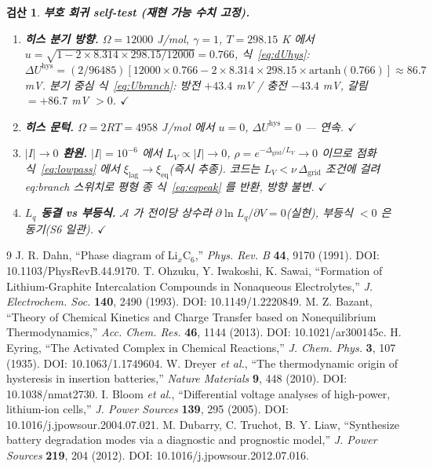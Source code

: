 \documentclass[11pt,a4paper]{article}
\newtheorem*{verifybox}{검산}
\newcommand{\eq}{\mathrm{eq}}
\newcommand{\hys}{\mathrm{hys}}
\begin{document}
\begin{verifybox}
\textbf{부호 회귀 self-test (재현 가능 수치 고정).}
\begin{enumerate}[label=\textbf{R\arabic*.},leftmargin=2.6em,itemsep=1pt]
\item \textbf{히스 분기 방향.} $\Omega=12000$ J/mol, $\gamma=1$, $T=298.15$ K 에서
$u=\sqrt{1-2\times8.314\times298.15/12000}=0.766$, 식~\eqref{eq:dUhys}:
$\Delta U^\hys=(2/96485)[12000\times0.766-2\times8.314\times298.15\times\mathrm{artanh}(0.766)]\approx86.7$ mV.
분기 중심 식~\eqref{eq:Ubranch}: 방전 $+43.4$ mV / 충전 $-43.4$ mV, 갈림 $=+86.7$ mV $>0$. $\checkmark$
\item \textbf{히스 문턱.} $\Omega=2RT=4958$ J/mol 에서 $u=0$, $\Delta U^\hys=0$ — 연속. $\checkmark$
\item \textbf{$|I|\!\to\!0$ 환원.} $|I|=10^{-6}$ 에서 $L_V\propto|I|\to0$, $\rho=e^{-\Delta_\mathrm{grid}/L_V}\to0$ 이므로 점화식~\eqref{eq:lowpass} 에서 $\xi_\mathrm{lag}\to\xi_\eq$(즉시 추종). 코드는 $L_V<\nu\,\Delta_\mathrm{grid}$ 조건에 걸려 eq:branch 스위치로 평형 종 식~\eqref{eq:eqpeak} 를 반환, 방향 불변. $\checkmark$
\item \textbf{$L_q$ 동결 vs 부등식.} $\mathcal A$ 가 전이당 상수라 $\partial\ln L_q/\partial V=0$(실현), 부등식 $<0$ 은 동기(S6 일관). $\checkmark$
\end{enumerate}
\end{verifybox}

\begin{thebibliography}{9}
 J. R. Dahn, ``Phase diagram of Li$_x$C$_6$,'' \emph{Phys. Rev. B} \textbf{44}, 9170 (1991). DOI: 10.1103/PhysRevB.44.9170.
 T. Ohzuku, Y. Iwakoshi, K. Sawai, ``Formation of Lithium-Graphite Intercalation Compounds in Nonaqueous Electrolytes,'' \emph{J. Electrochem. Soc.} \textbf{140}, 2490 (1993). DOI: 10.1149/1.2220849.
 M. Z. Bazant, ``Theory of Chemical Kinetics and Charge Transfer based on Nonequilibrium Thermodynamics,'' \emph{Acc. Chem. Res.} \textbf{46}, 1144 (2013). DOI: 10.1021/ar300145c.
 H. Eyring, ``The Activated Complex in Chemical Reactions,'' \emph{J. Chem. Phys.} \textbf{3}, 107 (1935). DOI: 10.1063/1.1749604.
 W. Dreyer \emph{et al.}, ``The thermodynamic origin of hysteresis in insertion batteries,'' \emph{Nature Materials} \textbf{9}, 448 (2010). DOI: 10.1038/nmat2730.
 I. Bloom \emph{et al.}, ``Differential voltage analyses of high-power, lithium-ion cells,'' \emph{J. Power Sources} \textbf{139}, 295 (2005). DOI: 10.1016/j.jpowsour.2004.07.021.
 M. Dubarry, C. Truchot, B. Y. Liaw, ``Synthesize battery degradation modes via a diagnostic and prognostic model,'' \emph{J. Power Sources} \textbf{219}, 204 (2012). DOI: 10.1016/j.jpowsour.2012.07.016.
\end{thebibliography}
\end{document}

